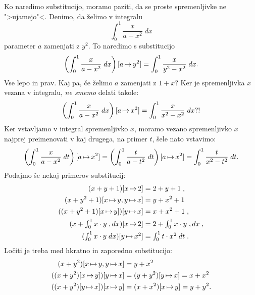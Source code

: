 Ko naredimo substitucijo, moramo paziti, da se proste spremenljivke ne
">ujamejo"<. Denimo, da želimo v integralu
%
\begin{equation*}
  \int_0^1 \frac{x}{a - x^2} \; dx
\end{equation*}
%
parameter $a$ zamenjati z $y^2$. To naredimo s substitucijo
%
\begin{equation*}
  \left(\int_0^1 \frac{x}{a - x^2} \; dx\right)[a \,{\mapsto}\, y^2] =
  \int_0^1 \frac{x}{y^2 - x^2} \; dx.
\end{equation*}
%
Vse lepo in prav. Kaj pa, če želimo $a$ zamenjati z $1 + x$? Ker je
spremenljivka $x$ vezana v integralu, \emph{ne smemo} delati takole:
%
\begin{equation*}
  \left(\int_0^1 \frac{x}{a - x^2} \; dx\right)[a \,{\mapsto}\, x^2] =
  \int_0^1 \frac{x}{x^2 - x^2} \; dx ?!
\end{equation*}
%
Ker vstavljamo v integral spremenljivko $x$, moramo vezano
spremenljivko $x$ najprej preimenovati v kaj drugega, na primer $t$,
šele nato vstavimo:
%
\begin{equation*}
  \left(\int_0^1 \frac{x}{a - x^2}\; dt \right)[a \,{\mapsto}\, x^2] =
  \left(\int_0^1 \frac{t}{a - t^2} \; dt\right)[a \,{\mapsto}\, x^2] =
  \int_0^1 \frac{t}{x^2 - t^2} \; dt.
\end{equation*}
%
Podajmo še nekaj primerov substitucij:
%
\begin{align*}
  (x + y + 1)[x \,{\mapsto}\, 2] &= 2 + y + 1 \;,
  \\
  (x + y^2 + 1)[x \,{\mapsto}\, y, y \,{\mapsto}\, x] &= y + x^2 + 1 \;
  \\
  ((x + y^2 + 1)[x \,{\mapsto}\, y])[y \,{\mapsto}\, x] &=
  x + x^2 + 1 \;,
  \\
  \textstyle
  (x + \int_0^1 x \cdot y \;, d x)[x \,{\mapsto}\, 2]
  &= \textstyle  2 + \int_0^1 x \cdot y \;, d x \;,
  \\
  \textstyle
  (\int_0^1 x \cdot y \; d x)[y \,{\mapsto}\, x^2]
  &= \textstyle \int_0^1 t \cdot x^2 \; d t \;.
\end{align*}
%
Ločiti je treba med hkratno in zaporedno substitucijo:
%
\begin{align*}
  (x + y^2)[x \,{\mapsto}\, y, y \,{\mapsto}\, x] &= y + x^2
  \\
  ((x + y^2)[x \,{\mapsto}\, y])[y \,{\mapsto}\, x] &=
  (y + y^2)[y \,{\mapsto}\, x] = x + x^2
  \\
  ((x + y^2)[y \,{\mapsto}\, x])[x \,{\mapsto}\, y] &=
  (x + x^2)[x \,{\mapsto}\, y] = y + y^2.
\end{align*}
%

